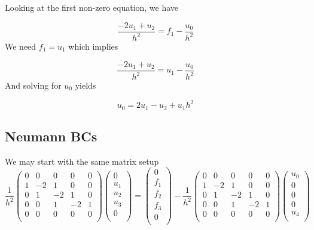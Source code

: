 \documentclass[11pt]{article}
\begin{document}
Looking at the first non-zero equation, we have

\begin{equation}
	\frac{-2u_1+u_2}{h^2} = f_1 - \frac{u_0}{h^2}
\end{equation}
We need $f_1 = u_1$ which implies

\begin{equation}
	\frac{-2u_1+u_2}{h^2} = u_1 - \frac{u_0}{h^2}
\end{equation}
And solving for $u_0$ yields

\begin{equation}
	u_0 = 2u_1 - u_2 + u_1h^2
\end{equation}

\subsection{Neumann BCs}
We may start with the same matrix setup
\begin{equation}
\frac{1}{h^2}
 \begin{pmatrix}
  0 &  0 &  0 &  0 &  0 \\
  1 & -2 &  1 &  0 &  0 \\
  0 &  1 & -2 &  1 &  0 \\
  0 &  0 &  1 & -2 &  1 \\
  0 &  0 &  0 &  0 &  0 \\
 \end{pmatrix}
 \begin{pmatrix}
  0 \\  u_1 \\  u_2 \\  u_3 \\  0 \\
 \end{pmatrix}
  = 
 \begin{pmatrix}
  0 \\  f_1 \\  f_2 \\  f_3 \\  0 \\
 \end{pmatrix}
   -
\frac{1}{h^2}
 \begin{pmatrix}
  0 &  0 &  0 &  0 &  0 \\
  1 & -2 &  1 &  0 &  0 \\
  0 &  1 & -2 &  1 &  0 \\
  0 &  0 &  1 & -2 &  1 \\
  0 &  0 &  0 &  0 &  0 \\
 \end{pmatrix}
 \begin{pmatrix}
  u_0 \\  0 \\  0 \\  0 \\  u_4 \\
 \end{pmatrix}
\end{equation}
\end{document}
